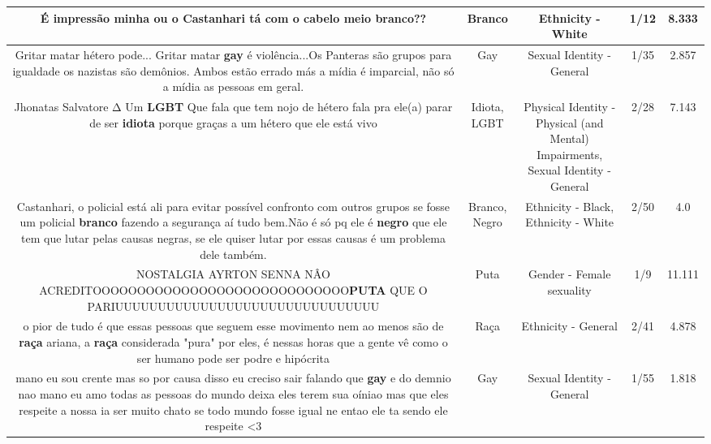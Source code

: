 \documentclass[11pt]{article}
\newlength\mylength
\begin{document}
\begin{center}
\begin{longtable}{|C{.65\mylength}|C{.30\mylength}|C{.12\mylength}|C{.12\mylength}|C{.12\mylength}|}
  \small É impressão minha ou o Castanhari tá com o cabelo meio \textbf{branco}??\normalsize   & Branco & Ethnicity - White & 1/12 & 8.333 \\  \hline
  \small Gritar matar hétero pode... Gritar matar \textbf{gay} é violência...Os Panteras são grupos para igualdade os nazistas são demônios.  Ambos estão errado más a mídia é imparcial, não só a mídia as pessoas em geral.\normalsize   & Gay & Sexual Identity - General & 1/35 & 2.857 \\  \hline
  \small Jhonatas Salvatore  Δ Um \textbf{LGBT} Que fala que tem nojo de hétero fala pra ele(a) parar de ser \textbf{idiota} porque graças a um hétero que ele está vivo\normalsize   & Idiota, LGBT & Physical Identity - Physical (and Mental) Impairments, Sexual Identity - General & 2/28 & 7.143 \\  \hline
  \small Castanhari, o policial está ali para evitar possível confronto com outros grupos se fosse um policial \textbf{branco} fazendo a segurança aí tudo bem.Não é só pq ele é \textbf{negro} que ele tem que lutar pelas causas negras,  se ele quiser lutar por essas causas é um problema dele também.\normalsize   & Branco, Negro & Ethnicity - Black, Ethnicity - White & 2/50 & 4.0 \\  \hline
  \small NOSTALGIA AYRTON SENNA NÂO ACREDITOOOOOOOOOOOOOOOOOOOOOOOOOOOOO\textbf{PUTA} QUE O PARIUUUUUUUUUUUUUUUUUUUUUUUUUUUUUUU\normalsize   & Puta & Gender - Female sexuality & 1/9 & 11.111 \\  \hline
  \small o pior de tudo é que essas pessoas que seguem esse movimento nem ao menos são de \textbf{raça} ariana, a \textbf{raça} considerada "pura" por eles, é nessas horas que a gente vê como o ser humano pode ser podre e hipócrita\normalsize   & Raça & Ethnicity - General & 2/41 & 4.878 \\  \hline
  \small mano eu sou crente mas so por causa disso eu creciso  sair falando que \textbf{gay} e do demnio nao mano eu amo todas as pessoas do mundo deixa eles terem sua oíniao mas que eles respeite a nossa ia ser muito chato se todo mundo fosse igual ne entao ele ta sendo ele respeite <3\normalsize   & Gay & Sexual Identity - General & 1/55 & 1.818 \\  \hline

\end{longtable}
\end{center}
\end{document}
